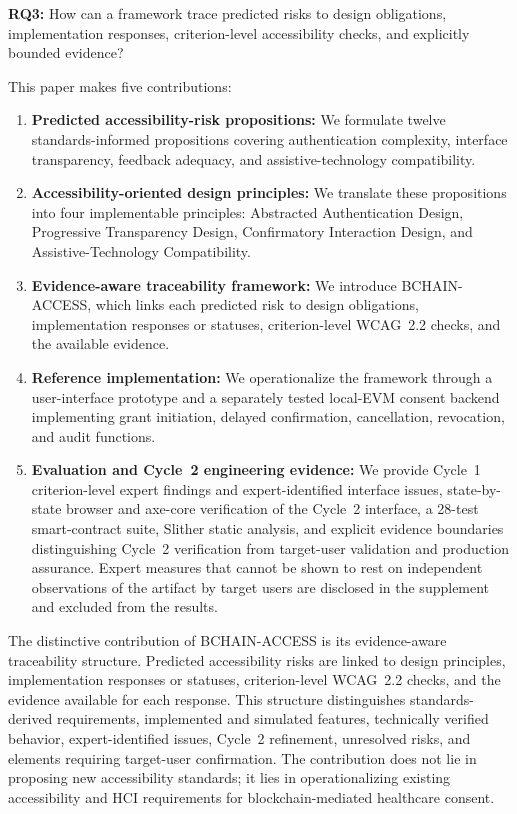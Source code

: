 \documentclass[journal]{IEEEtran}
\begin{document}
\noindent\textbf{RQ3:} How can a framework trace predicted risks to design obligations, implementation responses, criterion-level accessibility checks, and explicitly bounded evidence?

This paper makes five contributions:
\begin{enumerate}
\item \textbf{Predicted accessibility-risk propositions:} We formulate twelve standards-informed propositions covering authentication complexity, interface transparency, feedback adequacy, and assistive-technology compatibility.
\item \textbf{Accessibility-oriented design principles:} We translate these propositions into four implementable principles: Abstracted Authentication Design, Progressive Transparency Design, Confirmatory Interaction Design, and Assistive-Technology Compatibility.
\item \textbf{Evidence-aware traceability framework:} We introduce BCHAIN-ACCESS, which links each predicted risk to design obligations, implementation responses or statuses, criterion-level WCAG~2.2 checks, and the available evidence.
\item \textbf{Reference implementation:} We operationalize the framework through a user-interface prototype and a separately tested local-EVM consent backend implementing grant initiation, delayed confirmation, cancellation, revocation, and audit functions.
\item \textbf{Evaluation and Cycle~2 engineering evidence:} We provide Cycle~1 criterion-level expert findings and expert-identified interface issues, state-by-state browser and axe-core verification of the Cycle~2 interface, a 28-test smart-contract suite, Slither static analysis, and explicit evidence boundaries distinguishing Cycle~2 verification from target-user validation and production assurance. Expert measures that cannot be shown to rest on independent observations of the artifact by target users are disclosed in the supplement and excluded from the results.
\end{enumerate}

The distinctive contribution of BCHAIN-ACCESS is its evidence-aware traceability structure. Predicted accessibility risks are linked to design principles, implementation responses or statuses, criterion-level WCAG~2.2 checks, and the evidence available for each response. This structure distinguishes standards-derived requirements, implemented and simulated features, technically verified behavior, expert-identified issues, Cycle~2 refinement, unresolved risks, and elements requiring target-user confirmation. The contribution does not lie in proposing new accessibility standards; it lies in operationalizing existing accessibility and HCI requirements for blockchain-mediated healthcare consent.
\end{document}
